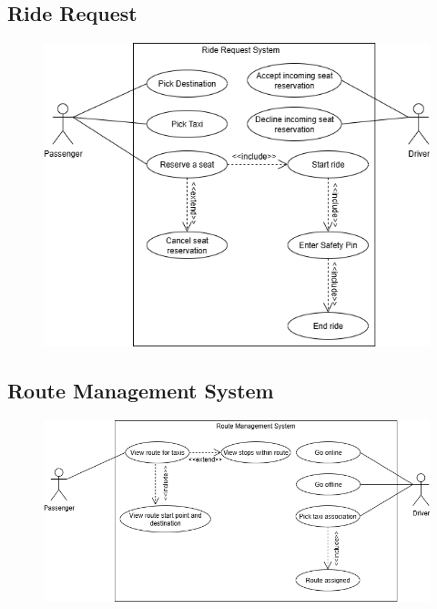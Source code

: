 \documentclass[a4paper,12pt]{article}
\begin{document}
     \subsection*{Ride Request}
    \begin{figure}[H]
      \centering
      \includegraphics[width=1\textwidth]{Ride Request System.png} 
    \end{figure}
     \subsection*{Route Management System}
    \begin{figure}[H]
      \centering
      \includegraphics[width=1\textwidth]{Route Management System.png} 
    \end{figure}
\end{document}

